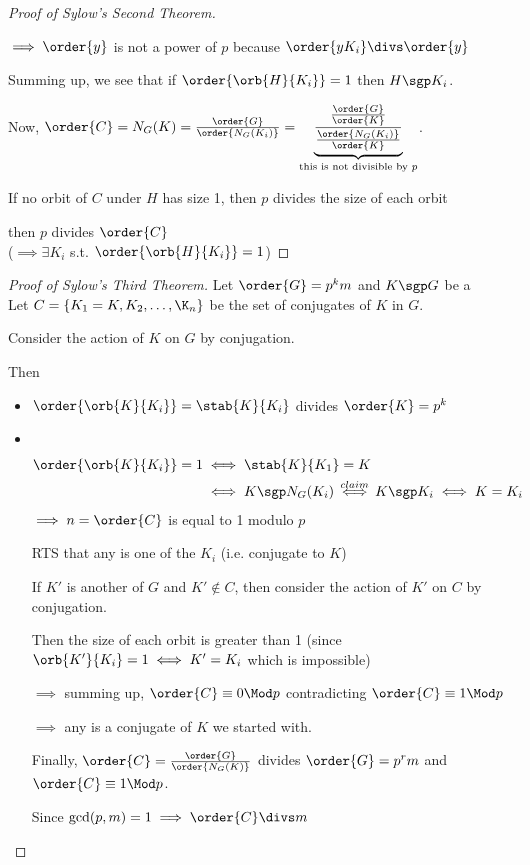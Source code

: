 \begin{proof}[Proof of Sylow's Second Theorem]
\begin{subproof}
        \(\implies \order{y}\) is not a power of \(p\) because \(\order{yK_i}\divs \order{y}\)
    \end{subproof}
    Summing up, we see that if \(\order{\orb{H}{K_i}}=1\) then \(H\sgp K_i\).

    Now, \(\order{C}=\index{G}{N_G(K)} = \frac{\order{G}}{\order{N_G(K_i)}} = \underbrace{\frac{\frac{\order{G}}{\order{K}}}{\frac{\order{N_G(K_i)}}{\order{K}}}}_{\text{this is not divisible by } p}\).

    If no orbit of \(C\) under \(H\) has size 1, then \(p\) divides the size of each orbit

    then \(p\) divides \(\order{C}\) \contradiction\\
    (\(\implies \exists K_i \) s.t. \(\order{\orb{H}{K_i}} = 1\))
\end{proof}

\begin{proof}[Proof of Sylow's Third Theorem]
    Let \(\order{G}=p^km\) and \(K \sgp G\) be a \spsgp \\
    Let \(C = \{K_1=K, K_2, \ldots, \K_n\}\) be the set of conjugates of \(K\) in \(G\).

    Consider the action of \(K\) on \(G\) by conjugation.

    Then \begin{itemize}
        \item \(\order{\orb{K}{K_i}}=\index{K}{\stab{K}{K_i}}\) divides \(\order{K}=p^k\)
        \item \ \vspace{-2em} \begin{align*}
            \order{\orb{K}{K_i}} = 1 &\iff \stab{K}{K_1} = K \\
            &\iff K\sgp N_G(K_i) \overset{claim}{\iff} K\sgp K_i \iff K = K_i
        \end{align*}
        \(\implies n = \order{C}\) is equal to 1 modulo \(p\)

        RTS that any \spsgp is one of the \(K_i\) (i.e. conjugate to \(K\))

        If \(K'\) is another \spsgp of \(G\) and \(K'\not\in C\), then consider the action of \(K'\) on \(C\) by conjugation.

        Then the size of each orbit is greater than 1 (since \(\orb{K'}{K_i}=1 \iff K'=K_i\) which is impossible)

        \(\implies\) summing up, \(\order{C}\equiv 0\Mod p\) contradicting \(\order{C}\equiv 1\Mod p\)

        \(\implies\) any \spsgp is a conjugate of \(K\) we started with.

        Finally, \(\order{C} = \frac{\order{G}}{\order{N_G(K)}}\) divides \(\order{G}=p^rm\) and \(\order{C}\equiv 1 \Mod p\).

        Since \(\gcd(p,m)=1\implies \order{C}\divs m\)
    \end{itemize}
\end{proof}
